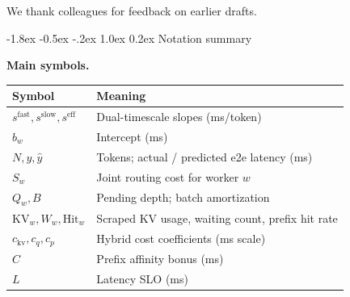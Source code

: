 \documentclass[pdflatex,sn-mathphys-num]{sn-jnl}
\makeatletter
\renewcommand{\section}{\@startsection{section}{1}{\z@}%
  {-1.8ex \@plus -0.5ex \@minus -.2ex}%
  {1.0ex \@plus 0.2ex}%
  {\normalfont\large\bfseries}}%
\makeatother
\begin{document}
\backmatter

We thank colleagues for feedback on earlier drafts.

\begin{appendices}

\section{Notation summary}
\label{app:notation}
\begin{center}
\textbf{Main symbols.}\smallskip
\begin{tabular}{@{}ll@{}}
\toprule
Symbol & Meaning \\
\midrule
$s^{\mathrm{fast}}, s^{\mathrm{slow}}, s^{\mathrm{eff}}$ & Dual-timescale slopes (ms/token) \\
$b_w$ & Intercept (ms) \\
$N,y,\hat{y}$ & Tokens; actual / predicted e2e latency (ms) \\
$S_w$ & Joint routing cost for worker $w$ \\
$Q_w,B$ & Pending depth; batch amortization \\
$\mathrm{KV}_w,W_w,\mathrm{Hit}_w$ & Scraped KV usage, waiting count, prefix hit rate \\
$c_{\mathrm{kv}},c_q,c_p$ & Hybrid cost coefficients (ms scale) \\
$C$ & Prefix affinity bonus (ms) \\
$L$ & Latency SLO (ms) \\
\bottomrule
\end{tabular}
\end{center}


\end{appendices}
\end{document}
